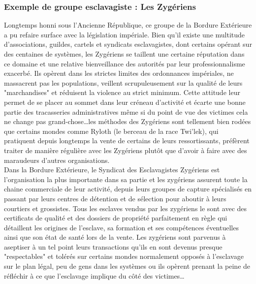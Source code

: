 \documentclass[twoside]{article}
\begin{document}
\subsubsection{Exemple de groupe esclavagiste : Les Zygériens}
Longtemps honni sous l'Ancienne République, ce groupe de la Bordure Extérieure a pu refaire surface avec la législation impériale. Bien qu'il existe une multitude d'associations, guildes, cartels et syndicats esclavagistes, dont certains opérant sur des centaines de systèmes, les Zygériens se taillent une certaine réputation dans ce domaine et une relative bienveillance des autorités par leur professionnalisme exacerbé. Ils opèrent dans les strictes limites des ordonnances impériales, ne massacrent pas les populations, veillent scrupuleusement sur la qualité de leurs "marchandises" et réduisent la violence au strict minimum.
Cette attitude leur permet de se placer au sommet dans leur créneau d'activité et écarte une bonne partie des tracasseries administratives même si du point de vue des victimes cela ne change pas grand-chose\ldots les méthodes des Zygériens sont tellement bien rodées que certains mondes comme Ryloth (le berceau de la race Twi'lek), qui pratiquent depuis longtemps la vente de certains de leurs ressortissants, préfèrent traiter de manière régulière avec les Zygériens plutôt que d'avoir à faire avec des maraudeurs d'autres organisations.\\

Dans la Bordure Extérieure, le Syndicat des Esclavagistes Zygériens est l'organisation la plus importante dans sa partie et les zygériens assurent toute la chaine commerciale de leur activité, depuis leurs groupes de capture spécialisés en passant par leurs centres de détention et de sélection pour aboutir à leurs courtiers et grossistes. Tous les esclaves vendus par les zygériens le sont avec des certificats de qualité et des dossiers de propriété parfaitement en règle qui détaillent les origines de l'esclave, sa formation et ses compétences éventuelles ainsi que son état de santé lors de la vente. Les zygériens sont parvenus à aseptiser à un tel point leurs transactions qu'ils en sont devenus presque "respectables" et tolérés sur certains mondes normalement opposés à l'esclavage sur le plan légal, peu de gens dans les systèmes ou ils opèrent prenant la peine de réfléchir à ce que l'esclavage implique du côté des victimes\ldots
\end{document}
